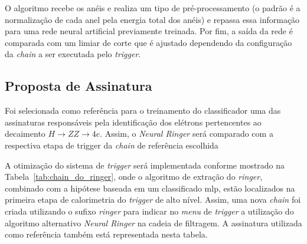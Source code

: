 O algoritmo recebe os anéis e realiza um tipo de pré-processamento (o padrão é a normalização de cada anel pela energia total dos anéis)
e repassa essa informação para uma rede neural artificial previamente treinada. Por fim, a saída da rede é comparada com um limiar de corte
que é ajustado dependendo da configuração da \textit{chain} a ser executada pelo \textit{trigger}.

\subsection{Proposta de Assinatura}

Foi selecionada como referência para o treinamento do classificador uma das assinaturas responsáveis pela 
identificação dos elétrons pertencentes ao decaimento $H\rightarrow ZZ\rightarrow 4e$. Assim, o \textit{Neural Ringer}
será comparado com a respectiva etapa de trigger da \textit{chain} de referência escolhida

A otimização do sistema de \textit{trigger} será implementada conforme mostrado na Tabela~\ref{tab:chain_do_ringer}, onde o algoritmo de extração do \textit{ringer},
combinado com a hipótese baseada em um classificado \gls{mlp}, estão localizados na primeira etapa de calorimetria do \textit{trigger} de alto nível.  Assim, uma nova \textit{chain} 
foi criada utilizando o sufixo \textit{ringer} para indicar no \textit{menu} de \textit{trigger} a utilização do algoritmo alternativo \textit{Neural Ringer} na cadeia de filtragem. A assinatura
utilizada como referência também está representada nesta tabela.



